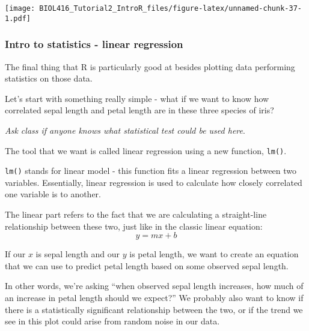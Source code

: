 \documentclass[]{article}
\newenvironment{Shaded}{\begin{snugshade}}{\end{snugshade}}
\newcommand{\KeywordTok}[1]{\textcolor[rgb]{0.13,0.29,0.53}{\textbf{#1}}}
\newcommand{\DataTypeTok}[1]{\textcolor[rgb]{0.13,0.29,0.53}{#1}}
\newcommand{\DecValTok}[1]{\textcolor[rgb]{0.00,0.00,0.81}{#1}}
\newcommand{\StringTok}[1]{\textcolor[rgb]{0.31,0.60,0.02}{#1}}
\newcommand{\OperatorTok}[1]{\textcolor[rgb]{0.81,0.36,0.00}{\textbf{#1}}}
\newcommand{\NormalTok}[1]{#1}
\begin{document}
\begin{Shaded}
\end{Shaded}

\texttt{[image: BIOL416\_Tutorial2\_IntroR\_files/figure-latex/unnamed-chunk-37-1.pdf]}

\subsubsection{Intro to statistics - linear
regression}\label{intro-to-statistics---linear-regression}

The final thing that R is particularly good at besides plotting data
performing statistics on those data.

Let's start with something really simple - what if we want to know how
correlated sepal length and petal length are in these three species of
iris?

\emph{Ask class if anyone knows what statistical test could be used
here}.

The tool that we want is called linear regression using a new function,
\texttt{lm()}.

\texttt{lm()} stands for linear model - this function fits a linear
regression between two variables. Essentially, linear regression is used
to calculate how closely correlated one variable is to another.

The linear part refers to the fact that we are calculating a
straight-line relationship between these two, just like in the classic
linear equation: \[ y = mx+b\]

If our \(x\) is sepal length and our \(y\) is petal length, we want to
create an equation that we can use to predict petal length based on some
observed sepal length.

In other words, we're asking ``when observed sepal length increases, how
much of an increase in petal length should we expect?'' We probably also
want to know if there is a statistically significant relationship
between the two, or if the trend we see in this plot could arise from
random noise in our data.
\end{document}

